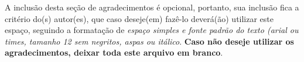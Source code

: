 \begin{agradecimentos}
A inclusão desta seção de agradecimentos é opcional, portanto, sua inclusão
fica a critério do(s) autor(es), que caso deseje(em) fazê-lo deverá(ão)
utilizar este espaço, seguindo a formatação de \textit{espaço simples e
fonte padrão do texto (arial ou times, tamanho 12 sem negritos, aspas ou
itálico}.
\textbf{Caso não deseje utilizar os agradecimentos, deixar toda este arquivo
em branco}.
\end{agradecimentos}